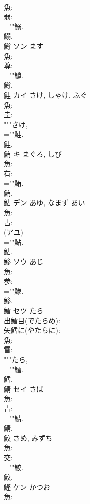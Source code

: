 \documentclass[8pt]{extreport}
\begin{document}
\begin{CJK}{UTF8}{min}
\\	魚: 
\\	弱: 
\\	=""鰯.
\\	鰯.
\\	鱒	ソン	ます		
\\	魚: 
\\	尊: 
\\	=""鱒.
\\	鱒.
\\	鮭	カイ	さけ, しゃけ, ふぐ		
\\	魚: 
\\	圭: 
\\	"""さけ, 
\\	=""鮭.
\\	鮭.
\\	鮪	キ	まぐろ, しび		
\\	魚: 
\\	有: 
\\	=""鮪.
\\	鮪.
\\	鮎	デン	あゆ, なまず	あい	
\\	魚: 
\\	占: 
\\	(アユ) 
\\	=""鮎.
\\	鮎.
\\	鯵	ソウ	あじ		
\\	魚: 
\\	参: 
\\	=""鯵.
\\	鯵.
\\	鱈	セツ	たら		
\\	出鱈目(でたらめ): 
\\	矢鱈に(やたらに): 
\\	魚: 
\\	雪: 
\\	"""たら, 
\\	=""鱈.
\\	鱈.
\\	鯖	セイ	さば		
\\	魚: 
\\	青: 
\\	=""鯖.
\\	鯖.
\\	鮫		さめ, みずち				
\\	魚: 
\\	交: 
\\	=""鮫.
\\	鮫.
\\	鰹	ケン	かつお		
\\	魚: 

\end{CJK}
\end{document}
